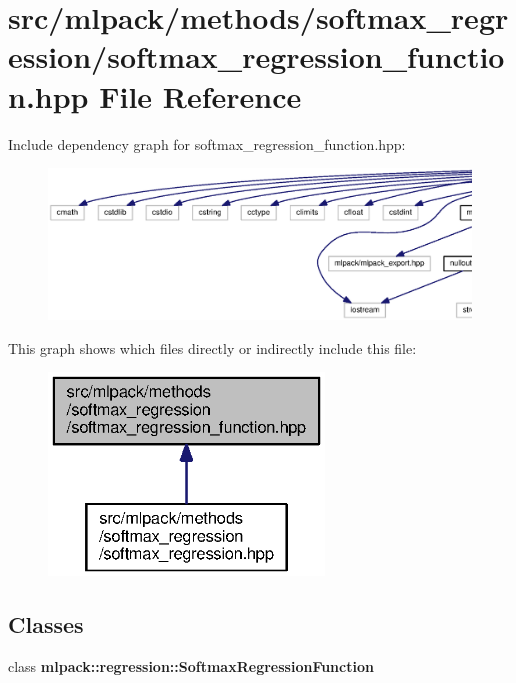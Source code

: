 \section{src/mlpack/methods/softmax\+\_\+regression/softmax\+\_\+regression\+\_\+function.hpp File Reference}
\label{softmax__regression__function_8hpp}
Include dependency graph for softmax\+\_\+regression\+\_\+function.\+hpp\+:
\nopagebreak
\begin{figure}[H]
\begin{center}
\leavevmode
\includegraphics[width=350pt]{softmax__regression__function_8hpp__incl}
\end{center}
\end{figure}
This graph shows which files directly or indirectly include this file\+:
\nopagebreak
\begin{figure}[H]
\begin{center}
\leavevmode
\includegraphics[width=208pt]{softmax__regression__function_8hpp__dep__incl}
\end{center}
\end{figure}
\subsection*{Classes}
\begin{DoxyCompactItemize}
\item 
class {\bf mlpack\+::regression\+::\+Softmax\+Regression\+Function}
\end{DoxyCompactItemize}
